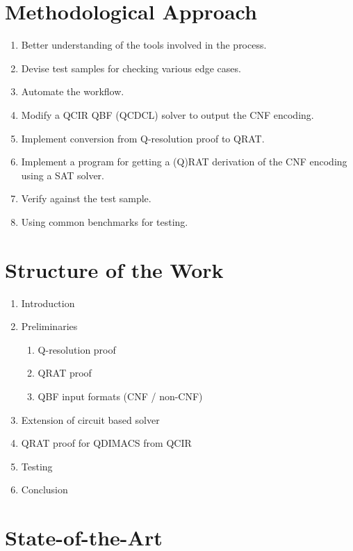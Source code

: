 \documentclass[12pt, a4paper]{article}
\begin{document}
\section{Methodological Approach}
\begin{enumerate}
    \item Better understanding of the tools involved in the process.
    \item Devise test samples for checking various edge cases.
    \item Automate the workflow.
    \item Modify a QCIR QBF (QCDCL) solver to output the CNF encoding.
    \item Implement conversion from Q-resolution proof to QRAT.
    \item Implement a program for getting a (Q)RAT derivation of the CNF encoding using a SAT solver.
    \item Verify against the test sample.
    \item Using common benchmarks for testing.
\end{enumerate}

\newpage

\section{Structure of the Work}

\begin{enumerate}
    \item Introduction
    \item Preliminaries
    \begin{enumerate}
        \item Q-resolution proof
        \item QRAT proof
        \item QBF input formats (CNF / non-CNF)
    \end{enumerate}
    \item Extension of circuit based solver
    \item QRAT proof for QDIMACS from QCIR
    \item Testing
    \item Conclusion
\end{enumerate}

\newpage

\section{State-of-the-Art}
\end{document}
